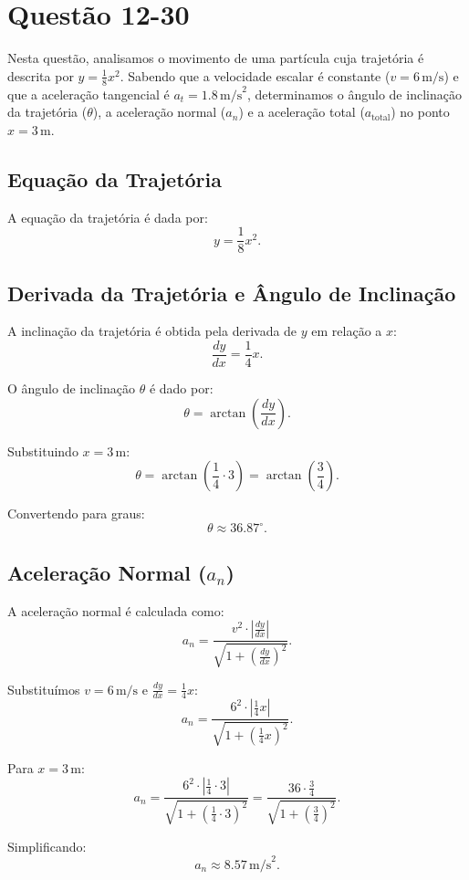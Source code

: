 \section{Questão 12-30}

Nesta questão, analisamos o movimento de uma partícula cuja trajetória é descrita por \(y = \frac{1}{8}x^2\). Sabendo que a velocidade escalar é constante (\(v = 6 \, \text{m/s}\)) e que a aceleração tangencial é \(a_t = 1.8 \, \text{m/s}^2\), determinamos o ângulo de inclinação da trajetória (\(\theta\)), a aceleração normal (\(a_n\)) e a aceleração total (\(a_{\text{total}}\)) no ponto \(x = 3 \, \text{m}\).

\subsection*{Equação da Trajetória}
A equação da trajetória é dada por:
\[
y = \frac{1}{8}x^2.
\]

\subsection*{Derivada da Trajetória e Ângulo de Inclinação}
A inclinação da trajetória é obtida pela derivada de \(y\) em relação a \(x\):
\[
\frac{dy}{dx} = \frac{1}{4}x.
\]

O ângulo de inclinação \(\theta\) é dado por:
\[
\theta = \arctan\left(\frac{dy}{dx}\right).
\]

Substituindo \(x = 3 \, \text{m}\):
\[
\theta = \arctan\left(\frac{1}{4} \cdot 3\right) = \arctan\left(\frac{3}{4}\right).
\]

Convertendo para graus:
\[
\theta \approx 36.87^\circ.
\]

\subsection*{Aceleração Normal (\(a_n\))}
A aceleração normal é calculada como:
\[
a_n = \frac{v^2 \cdot \left|\frac{dy}{dx}\right|}{\sqrt{1 + \left(\frac{dy}{dx}\right)^2}}.
\]

Substituímos \(v = 6 \, \text{m/s}\) e \(\frac{dy}{dx} = \frac{1}{4}x\):
\[
a_n = \frac{6^2 \cdot \left|\frac{1}{4}x\right|}{\sqrt{1 + \left(\frac{1}{4}x\right)^2}}.
\]

Para \(x = 3 \, \text{m}\):
\[
a_n = \frac{6^2 \cdot \left|\frac{1}{4} \cdot 3\right|}{\sqrt{1 + \left(\frac{1}{4} \cdot 3\right)^2}} = \frac{36 \cdot \frac{3}{4}}{\sqrt{1 + \left(\frac{3}{4}\right)^2}}.
\]

Simplificando:
\[
a_n \approx 8.57 \, \text{m/s}^2.
\]

